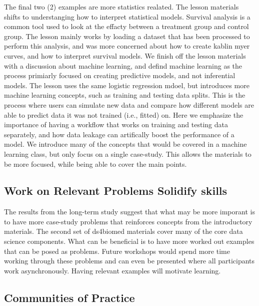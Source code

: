 \documentclass[020-persona_validation.tex]{subfiles}
\begin{document}
            The final two (2) examples are more statistics realated.
            The lesson materials shifts to understanging how to interpret statistical models.
            Survival analysis is a common tool used to look at the effacty between a treatment group and control group.
            The lesson mainly works by loading a dataset that has been processed to perform this analysis,
            and was more concerned about how to create kablin myer curves, and how to interpret survival models.
            We finish off the lesson materials with a discussion about machine learning,
            and defind machine learning as the process primiarly focused on creating predictive models,
            and not inferential models.
            The lesson uses the same logistic regression mdoel,
            but introduces more machine learning concepts, such as training and testing data splits.
            This is the process where users can simulate new data and compare how different models are able to predict data it was not trained (i.e., fitted) on.
            Here we emphasize the importance of having a workflow that works on training and testing data separately,
            and how data leakage can artifically boost the performance of a model.
            We introduce many of the concepts that would be covered in a machine learning class,
            but only focus on a single case-study.
            This allows the materials to be more focused,
            while being able to cover the main points.

        \subsection{Work on Relevant Problems Solidify skills}

            The results from the long-term study suggest that what may be more imporant is to have
            more case-study problems that reinforces concepts from the introductory materials.
            The second set of ds4biomed materials cover many of the core data science components.
            What can be beneficial is to have more worked out examples that can be posed as problems.
            Future workshops would spend more time working through these problems and can even be presented
            where all participants work asynchronously.
            Having relevant examples will motivate learning.


    \subsection{Communities of Practice}
\end{document}
